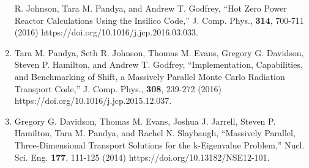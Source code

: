 \documentclass[letterpaper,11pt]{article}
\begin{document}
\begin{enumerate}
    R. Johnson, Tara M. Pandya, and Andrew T. Godfrey, ``Hot Zero
    Power Reactor Calculations Using the Insilico Code,''
    J. Comp. Phys., \textbf{314}, 700-711 (2016)
    https://doi.org/10.1016/j.jcp.2016.03.033.
  \item Tara M. Pandya, Seth R. Johnson, Thomas M. Evans, Gregory
    G. Davidson, Steven P. Hamilton, and Andrew T. Godfrey,
    ``Implementation, Capabilities, and Benchmarking of Shift, a
    Massively Parallel Monte Carlo Radiation Transport Code,''
    J. Comp. Phys., \textbf{308}, 239-272 (2016)
    https://doi.org/10.1016/j.jcp.2015.12.037.
  \item Gregory G. Davidson, Thomas M. Evans, Joshua J. Jarrell,
    Steven P. Hamilton, Tara M. Pandya, and Rachel N. Slaybaugh, ``Massively
    Parallel, Three-Dimensional Transport Solutions for the
    k-Eigenvalue Problem,'' Nucl. Sci. Eng. \textbf{177}, 111-125
    (2014) https://doi.org/10.13182/NSE12-101.
\end{enumerate}

\end{document}
